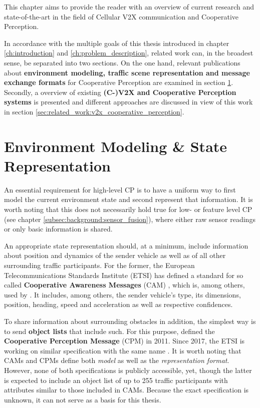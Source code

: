 This chapter aims to provide the reader with an overview of current research and state-of-the-art in the field of Cellular V2X communication and Cooperative Perception.
\par
\bigskip

In accordance with the multiple goals of this thesis introduced in chapter \ref{ch:introduction} and \ref{ch:problem_description}, related work can, in the broadest sense, be separated into two sections. On the one hand, relevant publications about \textbf{environment modeling, traffic scene representation and message exchange formats} for Cooperative Perception are examined in section \ref{sec:related_work:environment_modeling_state_representation}. Secondly, a overview of existing \textbf{(C-)V2X and Cooperative Perception systems} is presented and different approaches are discussed in view of this work in section \ref{sec:related_work:v2x_cooperative_perception}.

\section{Environment Modeling \& State Representation}
\label{sec:related_work:environment_modeling_state_representation}
An essential requirement for high-level CP is to have a uniform way to first model the current environment state and second represent that information. It is worth noting that this does not necessarily hold true for low- or feature level CP (see chapter \ref{subsec:background:sensor_fusion}), where either raw sensor readings or only basic information is shared.

An appropriate state representation should, at a minimum, include information about position and dynamics of the sender vehicle as well as of all other surrounding traffic participants. For the former, the European Telecommunications Standards Institute (ETSI) has defined a standard for so called \textbf{Cooperative Awareness Messages} (CAM) \cite{EuropeanTelecommunicationsStandardsInstituteETSI2011}, which is, among others, used by \cite{Rauch2011}. It includes, among others, the sender vehicle's type, its dimensions, position, heading, speed and acceleration as well as respective confidences.

To share information about surrounding obstacles in addition, the simplest way is to send \textbf{object lists} that include such. For this purpose, \cite{Rauch2011} defined the \textbf{Cooperative Perception Message} (CPM) in 2011. Since 2017, the ETSI is working on similar specification with the same name \cite{EuropeanTelecommunicationsStandardsInstituteETSI2019}. It is worth noting that CAMs and CPMs define both \textit{model} as well as the \textit{representation format}. However, none of both specifications is publicly accessible, yet, though the latter is expected to include an object list of up to 255 traffic participants with attributes similar to those included in CAMs. Because the exact specification is unknown, it can not serve as a basis for this thesis.

